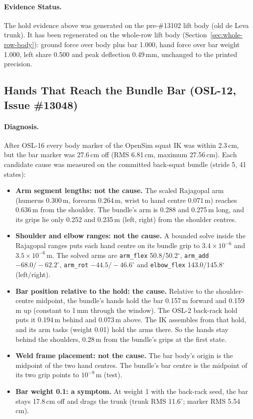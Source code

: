 \documentclass[11pt,a4paper]{article}
\begin{document}
\paragraph{Evidence Status.} The hold evidence above was generated on the
pre-\#13102 lift body (old de Leva trunk). It has been regenerated on the
whole-row lift body (Section~\ref{sec:whole-row-body}): ground force over body plus
bar 1.000, hand force over bar weight 1.000, left share 0.500 and peak
deflection 0.49\,mm, unchanged to the printed precision.

\subsection{Hands That Reach the Bundle Bar (OSL-12, Issue \#13048)}
\paragraph{Diagnosis.} After OSL-16 every body marker of the OpenSim squat
IK was within 2.3\,cm, but the bar marker was 27.6\,cm off (RMS 6.81\,cm,
maximum 27.56\,cm). Each candidate cause was measured on the committed
back-squat bundle (stride 5, 41 states):
\begin{itemize}[nosep]
\item \textbf{Arm segment lengths: not the cause.} The scaled Rajagopal arm
  (humerus 0.300\,m, forearm 0.264\,m, wrist to hand centre 0.071\,m)
  reaches 0.636\,m from the shoulder. The bundle's arm is 0.288 and
  0.275\,m long, and its grips lie only 0.252 and 0.235\,m (left, right)
  from the shoulder centres.
\item \textbf{Shoulder and elbow ranges: not the cause.} A bounded solve
  inside the Rajagopal ranges puts each hand centre on its bundle grip to
  $3.4\times10^{-6}$ and $3.5\times10^{-6}$\,m. The solved arms are
  \texttt{arm\_flex} 50.8/50.2$^\circ$, \texttt{arm\_add}
  $-68.0/-62.2^\circ$, \texttt{arm\_rot} $-44.5/-46.6^\circ$ and
  \texttt{elbow\_flex} 143.0/145.8$^\circ$ (left/right).
\item \textbf{Bar position relative to the hold: the cause.} Relative to
  the shoulder-centre midpoint, the bundle's hands hold the bar 0.157\,m
  forward and 0.159\,m up (constant to 1\,mm through the window). The OSL-2
  back-rack hold puts it 0.194\,m behind and 0.073\,m above. The IK
  assembles from that hold, and its arm tasks (weight 0.01) hold the arms
  there. So the hands stay behind the shoulders, 0.28\,m from the bundle's
  grips at the first state.
\item \textbf{Weld frame placement: not the cause.} The bar body's origin is
  the midpoint of the two hand centres. The bundle's bar centre is the
  midpoint of its two grip points to $10^{-9}$\,m (test).
\item \textbf{Bar weight 0.1: a symptom.} At weight 1 with the back-rack
  seed, the bar stays 17.8\,cm off and drags the trunk (trunk RMS
  11.6$^\circ$; marker RMS 5.54\,cm).
\end{itemize}
\end{document}
